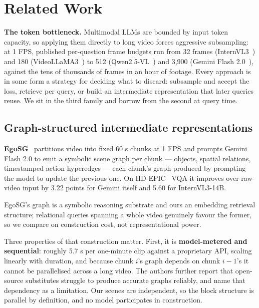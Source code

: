 \documentclass[sigconf,review,anonymous]{acmart}
\begin{document}
\section{Related Work}

\textbf{The token bottleneck.} Multimodal LLMs are bounded by input token capacity, so applying
them directly to long video forces aggressive subsampling: at 1 FPS, published per-question
frame budgets run from 32 frames (InternVL3~\cite{zhu2025internvl3}) and 180 (VideoLLaMA3~\cite{zhang2025videollama3}) to 512 (Qwen2.5-VL~\cite{bai2025qwen25vl}) and
3,900 (Gemini Flash 2.0~\cite{google2025gemini2flash}), against the tens of thousands of frames in an hour of footage.
Every approach is in some form a strategy for deciding what to discard: subsample and accept
the loss, retrieve per query, or build an intermediate representation that later queries
reuse. We sit in the third family and borrow from the second at query time.

\subsection{Graph-structured intermediate representations}

\textbf{EgoSG}~\cite{taluzzi2026egosg} partitions video into fixed 60 s chunks at 1 FPS and prompts
Gemini Flash 2.0 to emit a symbolic scene graph per chunk --- objects, spatial relations,
timestamped action hyperedges --- each chunk's graph produced by prompting the model to update
the previous one. On HD-EPIC~\cite{perrett2025hdepic} VQA it improves over raw-video input by 3.22 points for Gemini
itself and 5.60 for InternVL3-14B.

EgoSG's graph is a symbolic reasoning substrate and ours an embedding retrieval structure;
relational queries spanning a whole video genuinely favour the former, so we compare on
construction cost, not representational power.

Three properties of that construction matter. First, it is \textbf{model-metered and sequential}:
roughly 5.7 s per one-minute clip against a proprietary API, scaling linearly with duration,
and because chunk \(i\)'s graph depends on chunk \(i-1\)'s it cannot be parallelised across a
long video. The authors further report that open-source substitutes struggle to produce
accurate graphs reliably, and name that dependency as a limitation. Our scenes are
independent, so the block structure is parallel by definition, and no model participates in
construction.
\end{document}
